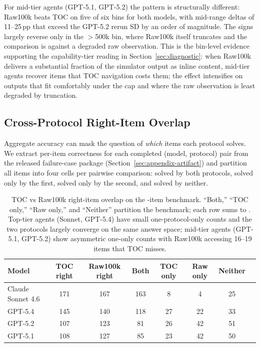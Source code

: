 \documentclass{article}
\begin{document}
For mid-tier agents (GPT-5.1, GPT-5.2) the pattern is structurally different: Raw100k beats TOC on five of six bins for both models, with mid-range deltas of 11--25\,pp that exceed the GPT-5.2 rerun SD by an order of magnitude. The signs largely reverse only in the $>$500k bin, where Raw100k itself truncates and the comparison is against a degraded raw observation. This is the bin-level evidence supporting the capability-tier reading in Section~\ref{sec:diagnostic}: when Raw100k delivers a substantial fraction of the simulator output as inline content, mid-tier agents recover items that TOC navigation costs them; the effect intensifies on outputs that fit comfortably under the cap and where the raw observation is least degraded by truncation.

\subsection{Cross-Protocol Right-Item Overlap}
\label{sec:appendix-cross-protocol-overlap}

Aggregate accuracy can mask the question of \emph{which} items each protocol solves. We extract per-item correctness for each completed (model, protocol) pair from the released failure-case package (Section~\ref{sec:appendix-artifact}) and partition all \BenchN{} items into four cells per pairwise comparison: solved by both protocols, solved only by the first, solved only by the second, and solved by neither.

\begin{table}[h]
\centering
\small
\setlength{\tabcolsep}{6pt}
\caption{TOC vs Raw100k right-item overlap on the \BenchN{}-item benchmark. ``Both,'' ``TOC only,'' ``Raw only,'' and ``Neither'' partition the benchmark; each row sums to \BenchN. Top-tier agents (Sonnet, GPT-5.4) have small one-protocol-only counts and the two protocols largely converge on the same answer space; mid-tier agents (GPT-5.1, GPT-5.2) show asymmetric one-only counts with Raw100k accessing 16--19 items that TOC misses.}
\label{tab:appendix-overlap-toc-raw100}
\begin{tabular}{lccccccc}
\toprule
Model & TOC right & Raw100k right & Both & TOC only & Raw only & Neither \\
\midrule
Claude Sonnet 4.6 & 171 & 167 & 163 & 8 & 4 & 25 \\
GPT-5.4 & 145 & 140 & 118 & 27 & 22 & 33 \\
GPT-5.2 & 107 & 123 & 81 & 26 & 42 & 51 \\
GPT-5.1 & 108 & 127 & 85 & 23 & 42 & 50 \\
\bottomrule
\end{tabular}
\end{table}
\end{document}
